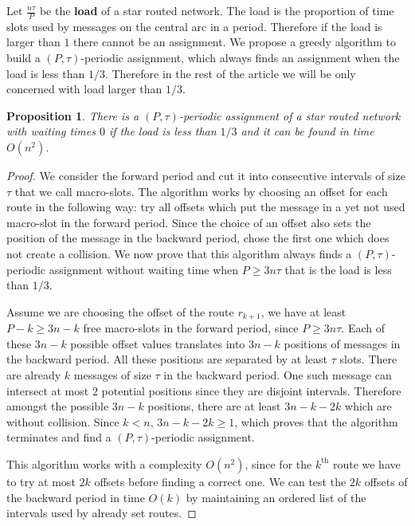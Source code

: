 \documentclass[10pt, conference, letterpaper]{IEEEtran}
\newtheorem{proposition}{Proposition}
\begin{document}
      Let $\frac{n\tau}{P}$ be the \textbf{load} of a star routed network. The load is the proportion of time slots used by messages on the central arc in a period. Therefore if the load is larger than $1$ there cannot be an assignment. We propose a greedy algorithm to build a $(P,\tau)$-periodic assignment, which always finds an assignment when the load is less than $1/3$. Therefore in the rest of the article we will be only concerned with load larger than $1/3$.
    
    \begin{proposition}
    There is a $(P,\tau)$-periodic assignment of a star routed network with waiting times $0$ if the load is less than $1/3$ and it can be found in time $O(n^2)$.
    \end{proposition}
    \begin{proof}
     We consider the forward period and cut it into consecutive intervals of size $\tau$ that we call macro-slots. The algorithm works by choosing an offset for each route in the following way: try all offsets which put the message in a yet not used macro-slot in the forward
     period. Since the choice of an offset also sets the position of the message in the backward period, chose the first one which does not create a collision. We now prove that this algorithm always finds a $(P,\tau)$-periodic assignment without waiting time when $P \geq 3n\tau$ that is the load is less than $1/3$.
     
     Assume we are choosing the offset of the route $r_{k+1}$, we have at least $P - k \geq 3n - k$ free macro-slots in the forward period, since $P \geq 3n\tau$. Each of these $3n - k$ possible offset values translates into $3n - k$ positions of messages in the backward period. All these positions are separated by at least $\tau$ slots. There are already $k$ messages of size $\tau$ in the backward period. One such message can intersect at most $2$ potential positions since they are disjoint intervals. Therefore  amongst the possible $3n - k$ positions, there are  at least $3n - k -2k$ which are without collision. Since $k < n$, $3n - k -2k \geq 1$, which proves that the algorithm terminates and find a  $(P,\tau)$-periodic assignment. 
   
     This algorithm works with a complexity $O(n^2)$, since for the $k^{\text{th}}$ route we have to try at most $2k$ offsets before finding a correct one. We can test the $2k$ offsets of the backward period in time $O(k)$ by maintaining an ordered list of the intervals used by already set routes.
     \end{proof}
\end{document}
